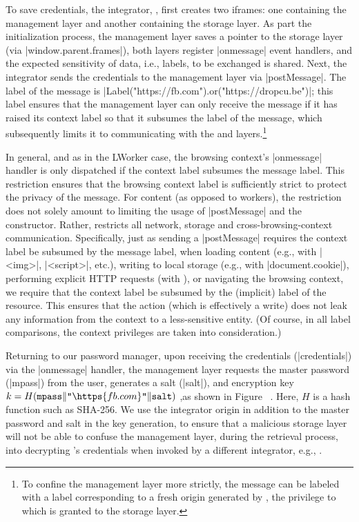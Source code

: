 %
To save credentials, the integrator, , first creates two
iframes: one containing the  management layer and
another containing the  storage layer.
%
As part the initialization process, the management layer saves a
pointer to the storage layer (via \js|window.parent.frames|), both
layers register \js|onmessage| event handlers, and the expected
sensitivity of data, i.e., labels, to be exchanged is shared.
%
Next, the integrator sends the credentials to the management
layer via \js|postMessage|.
%
The label of the message is
\js|Label("https://fb.com").or("https://dropcu.be")|; this label
ensures that the management layer can only receive the message if it
has raised its context label so that it subsumes the label of the
message, which subsequently limits it to communicating with the
 and  layers.\footnote{
  To confine the management layer more strictly, the message can be
  labeled with a label corresponding to a fresh origin generated by
  , the privilege to which is granted to the storage
  layer. 
}

In general, and as in the LWorker case, the browsing context's
\js|onmessage| handler is only dispatched if the context label
subsumes the message label.
%
This restriction ensures that the browsing context label is
sufficiently strict to protect the privacy of the message.
%
For content (as opposed to workers), the restriction does not solely
amount to limiting the usage of \js|postMessage| and the \xhr{}
constructor.
%
Rather, \sys{} restricts all network, storage and
cross-browsing-context communication.
%
Specifically, just as sending a \js|postMessage| requires the context
label be subsumed by the message label, when loading content (e.g.,
with \js|<img>|, \js|<script>|, etc.), writing to local storage (e.g.,
with \js|document.cookie|), performing explicit HTTP requests (with
\xhr{}), or navigating the browsing context, we require that the
context label be subsumed by the (implicit) label of the resource.
%
This ensures that the action (which is effectively a write) does not
leak any information from the context to a less-sensitive entity.
%
(Of course, in all label comparisons, the context privileges are taken
into consideration.)
%
 
Returning to our password manager, upon receiving the credentials
(\js|credentials|) via the \js|onmessage| handler, the management
layer requests the master password (\js|mpass|) from the user, 
generates a salt (\js|salt|), and encryption key $k =
H(\texttt{mpass}\|\texttt{"}\https{fb.com}\texttt{"}\|\texttt{salt})$
\iffigures
\ifcompletefigures
,as shown in Figure~
\fi
\fi
.
%
Here, $H$ is a hash function such as SHA-256.
%
We use the integrator origin in addition to the master password and
salt in the key generation, to ensure that a malicious storage layer
will not be able to confuse the management layer, during the retrieval
process, into decrypting 's credentials when invoked by
a different integrator, e.g., .


